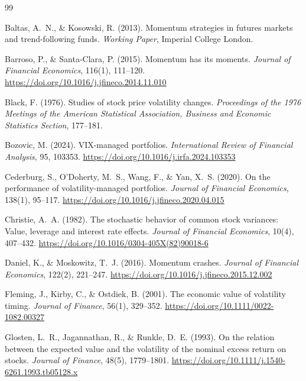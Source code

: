 
\begin{thebibliography}{99}

Baltas, A.~N., \& Kosowski, R. (2013). Momentum strategies in futures markets and trend-following funds. \textit{Working Paper}, Imperial College London.

Barroso, P., \& Santa-Clara, P. (2015). Momentum has its moments. \textit{Journal of Financial Economics}, 116(1), 111--120. \url{https://doi.org/10.1016/j.jfineco.2014.11.010}

Black, F. (1976). Studies of stock price volatility changes. \textit{Proceedings of the 1976 Meetings of the American Statistical Association, Business and Economic Statistics Section}, 177--181.

Bozovic, M. (2024). VIX-managed portfolios. \textit{International Review of Financial Analysis}, 95, 103353. \url{https://doi.org/10.1016/j.irfa.2024.103353}

Cederburg, S., O'Doherty, M.~S., Wang, F., \& Yan, X.~S. (2020). On the performance of volatility-managed portfolios. \textit{Journal of Financial Economics}, 138(1), 95--117. \url{https://doi.org/10.1016/j.jfineco.2020.04.015}

Christie, A.~A. (1982). The stochastic behavior of common stock variances: Value, leverage and interest rate effects. \textit{Journal of Financial Economics}, 10(4), 407--432. \url{https://doi.org/10.1016/0304-405X(82)90018-6}

Daniel, K., \& Moskowitz, T.~J. (2016). Momentum crashes. \textit{Journal of Financial Economics}, 122(2), 221--247. \url{https://doi.org/10.1016/j.jfineco.2015.12.002}

Fleming, J., Kirby, C., \& Ostdiek, B. (2001). The economic value of volatility timing. \textit{Journal of Finance}, 56(1), 329--352. \url{https://doi.org/10.1111/0022-1082.00327}

Glosten, L.~R., Jagannathan, R., \& Runkle, D.~E. (1993). On the relation between the expected value and the volatility of the nominal excess return on stocks. \textit{Journal of Finance}, 48(5), 1779--1801. \url{https://doi.org/10.1111/j.1540-6261.1993.tb05128.x}


\end{thebibliography}
